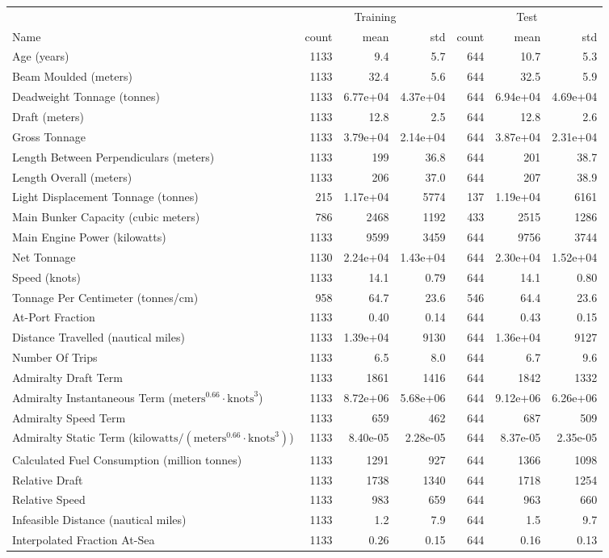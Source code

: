 
\begin{tabular}[t]{lrrrrrr}
\toprule
\multicolumn{1}{c}{ } & \multicolumn{3}{c}{Training} & \multicolumn{3}{c}{Test} \\
\cmidrule(l{3pt}r{3pt}){2-4} \cmidrule(l{3pt}r{3pt}){5-7}
Name & count & mean & std & count & mean & std\\
\midrule
Age (years) & 1133 & 9.4 & 5.7 & 644 & 10.7 & 5.3\\
Beam Moulded (meters) & 1133 & 32.4 & 5.6 & 644 & 32.5 & 5.9\\
Deadweight Tonnage (tonnes) & 1133 & 6.77e+04 & 4.37e+04 & 644 & 6.94e+04 & 4.69e+04\\
Draft (meters) & 1133 & 12.8 & 2.5 & 644 & 12.8 & 2.6\\
Gross Tonnage & 1133 & 3.79e+04 & 2.14e+04 & 644 & 3.87e+04 & 2.31e+04\\
\addlinespace
Length Between Perpendiculars (meters) & 1133 & 199 & 36.8 & 644 & 201 & 38.7\\
Length Overall (meters) & 1133 & 206 & 37.0 & 644 & 207 & 38.9\\
Light Displacement Tonnage (tonnes) & 215 & 1.17e+04 & 5774 & 137 & 1.19e+04 & 6161\\
Main Bunker Capacity (cubic meters) & 786 & 2468 & 1192 & 433 & 2515 & 1286\\
Main Engine Power (kilowatts) & 1133 & 9599 & 3459 & 644 & 9756 & 3744\\
\addlinespace
Net Tonnage & 1130 & 2.24e+04 & 1.43e+04 & 644 & 2.30e+04 & 1.52e+04\\
Speed (knots) & 1133 & 14.1 & 0.79 & 644 & 14.1 & 0.80\\
Tonnage Per Centimeter (tonnes/cm) & 958 & 64.7 & 23.6 & 546 & 64.4 & 23.6\\
At-Port Fraction & 1133 & 0.40 & 0.14 & 644 & 0.43 & 0.15\\
Distance Travelled (nautical miles) & 1133 & 1.39e+04 & 9130 & 644 & 1.36e+04 & 9127\\
\addlinespace
Number Of Trips & 1133 & 6.5 & 8.0 & 644 & 6.7 & 9.6\\
Admiralty Draft Term & 1133 & 1861 & 1416 & 644 & 1842 & 1332\\
Admiralty Instantaneous Term ($\text{meters}^{0.66} \cdot \text{knots}^3$) & 1133 & 8.72e+06 & 5.68e+06 & 644 & 9.12e+06 & 6.26e+06\\
Admiralty Speed Term & 1133 & 659 & 462 & 644 & 687 & 509\\
Admiralty Static Term ($\text{kilowatts}/(\text{meters}^{0.66} \cdot \text{knots}^3)$) & 1133 & 8.40e-05 & 2.28e-05 & 644 & 8.37e-05 & 2.35e-05\\
\addlinespace
Calculated Fuel Consumption (million tonnes) & 1133 & 1291 & 927 & 644 & 1366 & 1098\\
Relative Draft & 1133 & 1738 & 1340 & 644 & 1718 & 1254\\
Relative Speed & 1133 & 983 & 659 & 644 & 963 & 660\\
Infeasible Distance (nautical miles) & 1133 & 1.2 & 7.9 & 644 & 1.5 & 9.7\\
Interpolated Fraction At-Sea & 1133 & 0.26 & 0.15 & 644 & 0.16 & 0.13\\
\bottomrule
\end{tabular}
